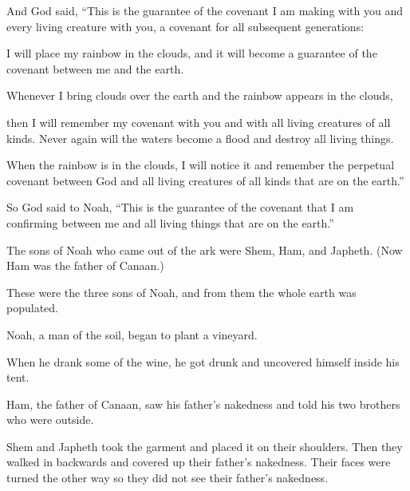 \begin{scripture}
 And God said, ``This is the guarantee of the covenant I am making with you and every living creature with you, a covenant for all subsequent generations:
 I will place my rainbow in the clouds, and it will become a guarantee of the covenant between me and the earth.
 Whenever I bring clouds over the earth and the rainbow appears in the clouds,
 then I will remember my covenant with you and with all living creatures of all kinds. Never again will the waters become a flood and destroy all living things.
 When the rainbow is in the clouds, I will notice it and remember the perpetual covenant between God and all living creatures of all kinds that are on the earth.''
\everypar{}

 So God said to Noah, ``This is the guarantee of the covenant that I am confirming between me and all living things that are on the earth.''
\everypar{}

 The sons of Noah who came out of the ark were Shem, Ham, and Japheth. (Now Ham was the father of Canaan.)
 These were the three sons of Noah, and from them the whole earth was populated.
\everypar{}

 Noah, a man of the soil, began to plant a vineyard.
 When he drank some of the wine, he got drunk and uncovered himself inside his tent.
 Ham, the father of Canaan, saw his father's nakedness and told his two brothers who were outside.
 Shem and Japheth took the garment and placed it on their shoulders. Then they walked in backwards and covered up their father's nakedness. Their faces were turned the other way so they did not see their father's nakedness.
\everypar{}


\end{scripture}
